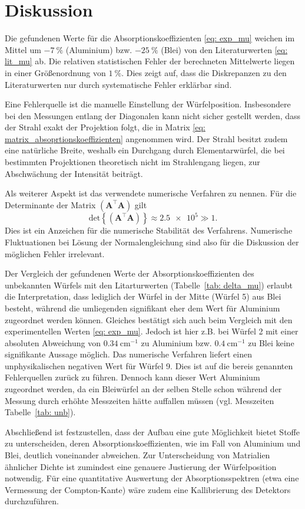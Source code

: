 \section{Diskussion}
Die gefundenen Werte für die Absorptionskoeffizienten \eqref{eq: exp_mu} weichen im Mittel
um $\SI{-7}{\percent}$ (Aluminium) bzw. $\SI{-25}{\percent}$ (Blei) von den Literaturwerten \eqref{eq: lit_mu} ab.
Die relativen statistischen Fehler der berechneten Mittelwerte liegen in einer Größenordnung von
$\SI{1}{\percent}$. Dies zeigt auf, dass die Diskrepanzen zu den Literaturwerten nur durch
systematische Fehler erklärbar sind.

Eine Fehlerquelle ist die manuelle Einstellung der Würfelposition. Insbesondere bei den Messungen
entlang der Diagonalen kann nicht sicher gestellt werden, dass der Strahl exakt der Projektion folgt,
die in Matrix \eqref{eq: matrix_absoprtionskoeffizienten} angenommen wird. Der Strahl besitzt zudem eine natürliche Breite, weshalb
ein Durchgang durch Elementarwürfel, die bei bestimmten Projektionen theoretisch nicht im Strahlengang liegen, zur
Abschwächung der Intensität beiträgt.

Als weiterer Aspekt ist das verwendete numerische Verfahren zu nennen. Für die Determinante der Matrix
$\left(\symbf{A}^\top \symbf{A}\right)$ gilt
\begin{equation}
  \mathup{det}\left\{\left(\symbf{A}^\top \symbf{A}\right)\right\} \approx \num{2.5e5} \gg 1.
\end{equation}
Dies ist ein Anzeichen für die numerische Stabilität des Verfahrens. Numerische Fluktuationen bei
Lösung der Normalengleichung sind also für die Diskussion der möglichen Fehler irrelevant.

Der Vergleich der gefundenen Werte der Absorptionskoeffizienten des unbekannten Würfels mit den
Litarturwerten (Tabelle~\ref{tab: delta_mu}) erlaubt die Interpretation, dass lediglich der
Würfel in der Mitte (Würfel 5) aus Blei besteht, während die umliegenden signifikant eher dem Wert %
für Aluminium zugeordnet werden können. Gleiches bestätigt sich auch beim Vergleich mit den experimentellen
Werten \eqref{eq: exp_mu}. Jedoch ist hier z.B. bei Würfel 2 mit einer absoluten Abweichung von $\SI{0.34}{\centi\meter^{-1}}$ zu Aluminium
bzw. $\SI{0.4}{\centi\meter^{-1}}$ zu Blei keine signifikante Aussage möglich. Das numerische Verfahren liefert einen unphysikalischen %
negativen Wert für Würfel 9. Dies ist auf die bereis genannten Fehlerquellen zurück zu führen. %
Dennoch kann dieser Wert Aluminium zugeordnet werden, da ein Bleiwürfel an der selben Stelle schon während
der Messung durch erhöhte Messzeiten hätte auffallen müssen (vgl. Messzeiten Tabelle~\ref{tab: unb}).

Abschließend ist festzustellen, dass der Aufbau eine gute Möglichkeit bietet Stoffe zu unterscheiden, deren
Absorptionskoeffizienten, wie im Fall von Aluminium und Blei, deutlich voneinander abweichen. Zur Unterscheidung
von Matrialien ähnlicher Dichte ist zumindest eine genauere Justierung der Würfelposition notwendig.
Für eine quantitative Auswertung der Absorptionsspektren (etwa eine Vermessung der Compton-Kante) wäre zudem eine
Kallibrierung des Detektors durchzuführen.

